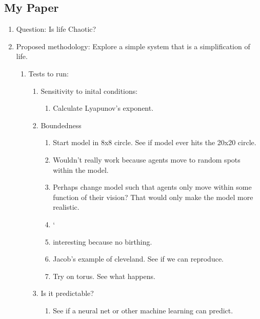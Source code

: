\documentclass[11pt]{article}
\begin{document}
    \subsection{My Paper}
        \begin{enumerate}
            \item Question: Is life Chaotic?
            \item Proposed methodology: 
                Explore a simple system that is a simplification of life.
                \begin{enumerate}
                    \item 
                        Tests to run:
                        \begin{enumerate}
                            \item Sensitivity to inital conditions:
                                \begin{enumerate}
                                    \item Calculate Lyapunov's exponent.
                                \end{enumerate}
                            \item Boundedness
                                \begin{enumerate}
                                    \item Start model in 8x8 circle. See if model ever hits the 20x20 circle.
                                    \item Wouldn't really work because agents move to random spots within the model.
                                    \item Perhaps change model such that agents only move within some function of their vision? That would only make the model more realistic.
                                    \item `
                                    \item interesting because no birthing. 
                                    \item Jacob's example of cleveland. See if we can reproduce.
                                    \item Try on torus. See what happens.
                                \end{enumerate}
                            \item Is it predictable?
                                \begin{enumerate}
                                    \item See if a neural net or other machine learning can predict.

\end{enumerate}
\end{enumerate}
\end{enumerate}
\end{enumerate}
\end{document}
